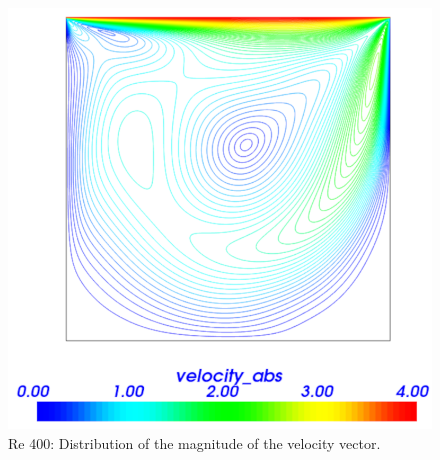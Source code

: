\begin{figure}[H]
\includegraphics[scale=0.35]{DC_velocity_mag_VTK}
\caption{Re 400: Distribution of the magnitude of the velocity vector.}\label{fg:DC_velocity_magnitude}
\end{figure} 

